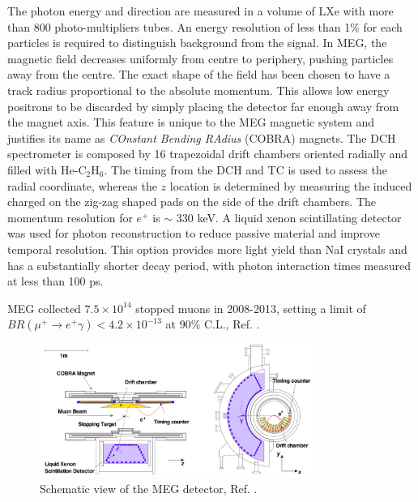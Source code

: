 The photon energy and direction are measured in a volume of LXe with more than 800 photo-multipliers tubes. 
An energy resolution of less than 1\% for each particles is required to distinguish background from the signal. 
In MEG, the magnetic field decreases uniformly from centre to periphery, pushing particles away from the centre. 
The exact shape of the field has been chosen to have a track radius proportional to the absolute momentum.
This allows low energy positrons to be discarded by simply placing the detector far enough away from the magnet axis. 
This feature is unique to the MEG magnetic system and justifies its name as \textit{COnstant Bending RAdius} (COBRA) magnets.
The DCH spectrometer is composed by 16 trapezoidal drift chambers oriented radially and filled with He-C$_2$H$_6$. 
The timing from the DCH and TC is used to assess the radial coordinate, whereas the $z$ location is determined by measuring the induced
charged on the zig-zag shaped pads on the side of the drift chambers. The momentum resolution for $e^+$ is $\sim$ 330 keV.
A liquid xenon scintillating detector was used for photon reconstruction to reduce passive material and improve temporal resolution. 
This option provides more light yield than NaI crystals and has a substantially shorter decay period, {\violet with photon interaction times measured at less than 100 ps.}


MEG collected $7.5 \times 10^{14}$ stopped muons in 2008-2013, setting a limit of $BR(\mu^+ \rightarrow e^+ \gamma) < 4.2 \times 10^{-13}$ at 90\% C.L., Ref. \cite{megi}.
\begin{figure}[!h]
\centering
\includegraphics[width =0.8\textwidth]{figures/png/Screenshot_20240321_115127.png}
\caption[MEG detector.]{Schematic view of the MEG detector, Ref. \cite{megi}.}
\label{fig:meg}
\end{figure}
